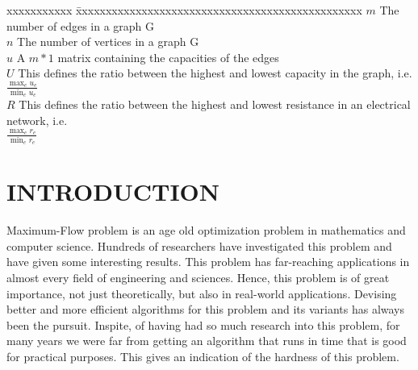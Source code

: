 \documentclass[BTech]{iitmdiss}
\begin{document}
 \begin{singlespace}
 \begin{tabbing}
 xxxxxxxxxxx \= xxxxxxxxxxxxxxxxxxxxxxxxxxxxxxxxxxxxxxxxxxxxxxxx \kill
 \textbf{$m$}  \> The number of edges in a graph G \\
 
 \textbf{$n$} \> The number of vertices in a graph G \\
 
 \textbf{$u$}  \> A $m \ast 1$ matrix containing the capacities of the edges \\
 
 \textbf{$U$}  \> This defines the ratio between the highest and lowest capacity in the graph, i.e.\\
		  \hspace{25mm}$\frac{\displaystyle\max_e u_e}{\displaystyle\min_e u_e}$ \\
 \textbf{$R$}  \> This defines the ratio between the highest and lowest resistance in an electrical network, i.e.\\
		  \hspace{25mm}$\frac{\displaystyle\max_e r_e}{\displaystyle\min_e r_e}$ \\
 \end{tabbing}
 \end{singlespace}
 
 \pagebreak
 \clearpage




 \chapter{INTRODUCTION}
 \label{chap:intro}
    Maximum-Flow problem is an age old optimization problem in mathematics and computer science. Hundreds of researchers have investigated this problem
    and have given some interesting results. This problem has far-reaching applications in almost every field of engineering and sciences. Hence, this 
    problem is of great importance, not just theoretically, but also in real-world applications. Devising better and more efficient algorithms
    for this problem and its variants has always been the pursuit. Inspite, of having had so much research into this problem, for many years we were far from getting an algorithm
    that runs in time that is good for practical purposes. This gives an indication of the hardness of this problem.
    
\end{document}
